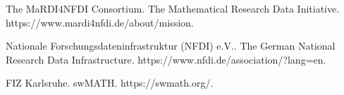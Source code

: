\documentclass[article,A4,11pt]{llncs}
\begin{document}

\begin{thebibliography}{10}
{\sc The MaRDI4NFDI Consortium}. {The Mathematical Research Data Initiative}. https://www.mardi4nfdi.de/about/mission.

{\sc Nationale Forschungsdateninfrastruktur (NFDI) e.V.}. {The German National Research Data Infrastructure}. https://www.nfdi.de/association/?lang=en.

{\sc FIZ Karlsruhe}. {swMATH}. https://swmath.org/.
\end{thebibliography}
\end{document}
